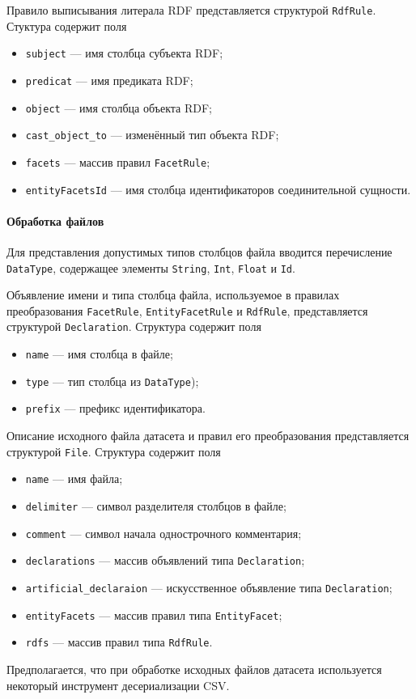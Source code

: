 Правило выписывания литерала RDF представляется структурой \texttt{RdfRule}. Стуктура содержит поля
\begin{itemize}
    \item \texttt{subject} --- имя столбца субъекта RDF;
    \item \texttt{predicat} --- имя предиката RDF;
    \item \texttt{object} --- имя столбца объекта RDF;
    \item \texttt{cast\_object\_to} --- изменённый тип объекта RDF;
    \item \texttt{facets} --- массив правил \texttt{FacetRule};
    \item \texttt{entityFacetsId} --- имя столбца идентификаторов соединительной сущности.
\end{itemize}

\paragraph{Обработка файлов}

Для представления допустимых типов столбцов файла вводится перечисление \texttt{DataType}, содержащее
элементы \texttt{String}, \texttt{Int}, \texttt{Float} и \texttt{Id}.

Объявление имени и типа столбца файла, используемое в правилах преобразования \texttt{FacetRule},
\texttt{EntityFacetRule} и \texttt{RdfRule}, представляется структурой \texttt{Declaration}.
Структура содержит поля
\begin{itemize}
    \item \texttt{name} --- имя столбца в файле;
    \item \texttt{type} --- тип столбца из \texttt{DataType});
    \item \texttt{prefix} --- префикс идентификатора.
\end{itemize}

Описание исходного файла датасета и правил его преобразования представляется структурой \texttt{File}.
Структура содержит поля
\begin{itemize}
    \item \texttt{name} --- имя файла;
    \item \texttt{delimiter} --- символ разделителя столбцов в файле;
    \item \texttt{comment} --- символ начала однострочного комментария;
    \item \texttt{declarations} --- массив объявлений типа \texttt{Declaration};
    \item \texttt{artificial\_declaraion} --- искусственное объявление типа \texttt{Declaration};
    \item \texttt{entityFacets} --- массив правил типа \texttt{EntityFacet};
    \item \texttt{rdfs} --- массив правил типа \texttt{RdfRule}.
\end{itemize}
Предполагается, что при обработке исходных файлов датасета используется некоторый инструмент
десериализации CSV.

